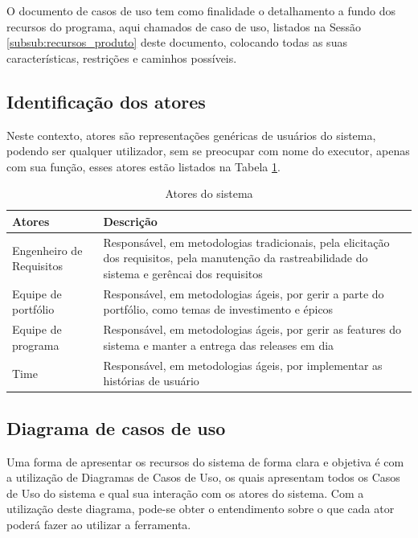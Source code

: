 
O documento de casos de uso tem como finalidade o detalhamento a fundo dos recursos do programa, aqui chamados de caso de uso, listados na Sessão \ref{subsub:recursos_produto} deste documento, colocando todas as suas características, restrições e caminhos possíveis.

\subsection{Identificação dos atores}

Neste contexto, atores são representações genéricas de usuários do sistema, podendo ser qualquer utilizador, sem se preocupar com nome do executor, apenas com sua função, esses atores estão listados na Tabela \ref{tab:atores}.

\begin{table}[H]
\centering
\begin{tabular}{|l|p{8cm}|}

\hline
\textbf{Atores} &
\textbf{Descrição}
\\ \hline
Engenheiro de Requisitos &
Responsável, em metodologias tradicionais, pela elicitação dos requisitos, pela manutenção da rastreabilidade do sistema e gerêncai dos requisitos
\\ \hline
Equipe de portfólio &
Responsável, em metodologias ágeis, por gerir a parte do portfólio, como temas de investimento e épicos
\\ \hline
Equipe de programa &
Responsável, em metodologias ágeis, por gerir as features do sistema e manter a entrega das releases em dia
\\ \hline
Time &
Responsável, em metodologias ágeis, por implementar as histórias de usuário
\\ \hline

\end{tabular}
\caption{Atores do sistema}
\label{tab:atores}
\end{table}

\subsection{Diagrama de casos de uso}

Uma forma de apresentar os recursos do sistema de forma clara e objetiva é com a utilização de Diagramas de Casos de Uso, os quais apresentam todos os Casos de Uso do sistema e qual sua interação com os atores do sistema. Com a utilização deste diagrama, pode-se obter o entendimento sobre o que cada ator poderá fazer ao utilizar a ferramenta.

